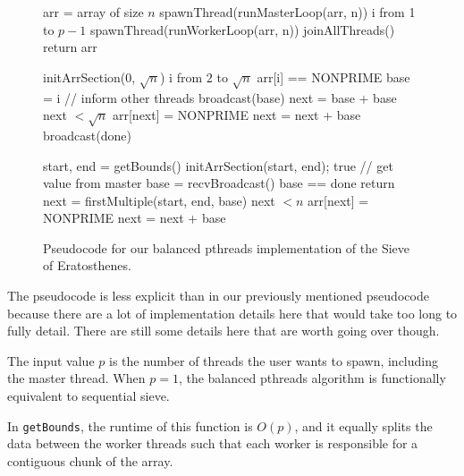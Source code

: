 \documentclass[11pt,twocolumn]{article}
\begin{document}
\begin{figure}
    \begin{codebox}
        \li arr = array of size $n$
        \li spawnThread(runMasterLoop(arr, n))
        \li {} i from 1 to $p-1$
        \Do
            \li spawnThread(runWorkerLoop(arr, n))
        \End
        \li joinAllThreads()
        \li return arr
    \end{codebox}
    \begin{codebox}
        \li initArrSection(0, $\sqrt{n}$)
        \li {} i from $2$ to $\sqrt{n}$
        \Do
            \li \If arr[i] == NONPRIME
            \Do
                \li base = i
                \li // inform other threads
                \li broadcast(base)
                \li next = base + base
                \li {} next $< \sqrt{n}$
                \Do
                    \li arr[next] = NONPRIME
                    \li next = next + base
                \End
            \End
        \End
        \li broadcast(done)
    \end{codebox}
    \begin{codebox}
        \li start, end = getBounds()
        \li initArrSection(start, end);
        \li {} true
        \Do
            \li // get value from master
            \li base = recvBroadcast()
            \li \If base == done
            \Do
                \li return
            \End
            \li next = firstMultiple(start, end, base)
            \li {} next $< n$
            \Do
                \li arr[next] = NONPRIME
                \li next = next + base
            \End
        \End
    \end{codebox}
    \caption{{\label{balpseud}} Pseudocode for our balanced
    pthreads implementation of the Sieve of Eratosthenes.}
\end{figure}

The pseudocode is less explicit than in our previously mentioned
pseudocode because there are a lot of implementation details
here that would take too long to fully detail. There are still
some details here that are worth going over though.

The input value $p$ is the number of threads the user wants to spawn,
including the master thread. When $p = 1$, the balanced pthreads 
algorithm is functionally equivalent to sequential sieve.

In \texttt{getBounds}, the runtime of this function is $O(p)$, and it
equally splits the data between the worker threads such that each
worker is responsible for a contiguous chunk of the array.
\end{document}
